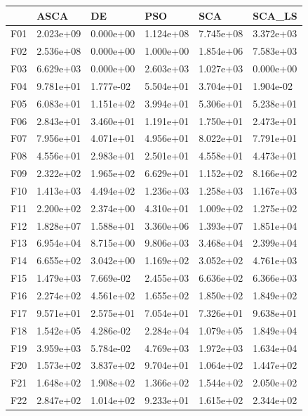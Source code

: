 \begin{tabular}{llllll}
\toprule
{} &       ASCA &         DE &        PSO &        SCA &     SCA\_LS \\
\midrule
F01  &  2.023e+09 &  0.000e+00 &  1.124e+08 &  7.745e+08 &  3.372e+03 \\
F02  &  2.536e+08 &  0.000e+00 &  1.000e+00 &  1.854e+06 &  7.583e+03 \\
F03  &  6.629e+03 &  0.000e+00 &  2.603e+03 &  1.027e+03 &  0.000e+00 \\
F04  &  9.781e+01 &  1.777e-02 &  5.504e+01 &  3.704e+01 &  1.904e-02 \\
F05  &  6.083e+01 &  1.151e+02 &  3.994e+01 &  5.306e+01 &  5.238e+01 \\
F06  &  2.843e+01 &  3.460e+01 &  1.191e+01 &  1.750e+01 &  2.473e+01 \\
F07  &  7.956e+01 &  4.071e+01 &  4.956e+01 &  8.022e+01 &  7.791e+01 \\
F08  &  4.556e+01 &  2.983e+01 &  2.501e+01 &  4.558e+01 &  4.473e+01 \\
F09  &  2.322e+02 &  1.965e+02 &  6.629e+01 &  1.152e+02 &  8.166e+02 \\
F10  &  1.413e+03 &  4.494e+02 &  1.236e+03 &  1.258e+03 &  1.167e+03 \\
F11  &  2.200e+02 &  2.374e+00 &  4.310e+01 &  1.009e+02 &  1.275e+02 \\
F12  &  1.828e+07 &  1.588e+01 &  3.360e+06 &  1.393e+07 &  1.851e+04 \\
F13  &  6.954e+04 &  8.715e+00 &  9.806e+03 &  3.468e+04 &  2.399e+04 \\
F14  &  6.655e+02 &  3.042e+00 &  1.169e+02 &  3.052e+02 &  4.761e+03 \\
F15  &  1.479e+03 &  7.669e-02 &  2.455e+03 &  6.636e+02 &  6.366e+03 \\
F16  &  2.274e+02 &  4.561e+02 &  1.655e+02 &  1.850e+02 &  1.849e+02 \\
F17  &  9.571e+01 &  2.575e+01 &  7.054e+01 &  7.326e+01 &  9.638e+01 \\
F18  &  1.542e+05 &  4.286e-02 &  2.284e+04 &  1.079e+05 &  1.849e+04 \\
F19  &  3.959e+03 &  5.784e-02 &  4.769e+03 &  1.972e+03 &  1.634e+04 \\
F20  &  1.573e+02 &  3.837e+02 &  9.704e+01 &  1.064e+02 &  1.447e+02 \\
F21  &  1.648e+02 &  1.908e+02 &  1.366e+02 &  1.544e+02 &  2.050e+02 \\
F22  &  2.847e+02 &  1.014e+02 &  9.233e+01 &  1.615e+02 &  2.344e+02 \\

\end{tabular}
